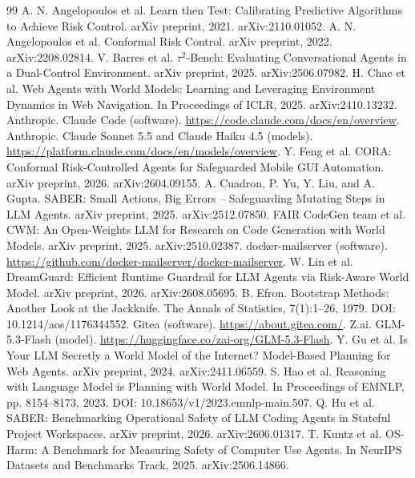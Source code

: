 \documentclass[11pt]{article}
\begin{document}
\begin{thebibliography}{99}\small
{} A. N. Angelopoulos et al. Learn then Test: Calibrating Predictive Algorithms to Achieve Risk Control. arXiv preprint, 2021. arXiv:2110.01052.
 A. N. Angelopoulos et al. Conformal Risk Control. arXiv preprint, 2022. arXiv:2208.02814.
 V. Barres et al. $\tau^2$-Bench: Evaluating Conversational Agents in a Dual-Control Environment. arXiv preprint, 2025. arXiv:2506.07982.
 H. Chae et al. Web Agents with World Models: Learning and Leveraging Environment Dynamics in Web Navigation. In Proceedings of ICLR, 2025. arXiv:2410.13232.
 Anthropic. Claude Code (software). \url{https://code.claude.com/docs/en/overview}.
 Anthropic. Claude Sonnet 5.5 and Claude Haiku 4.5 (models). \url{https://platform.claude.com/docs/en/models/overview}.
 Y. Feng et al. CORA: Conformal Risk-Controlled Agents for Safeguarded Mobile GUI Automation. arXiv preprint, 2026. arXiv:2604.09155.
 A. Cuadron, P. Yu, Y. Liu, and A. Gupta. SABER: Small Actions, Big Errors -- Safeguarding Mutating Steps in LLM Agents. arXiv preprint, 2025. arXiv:2512.07850.
 FAIR CodeGen team et al. CWM: An Open-Weights LLM for Research on Code Generation with World Models. arXiv preprint, 2025. arXiv:2510.02387.
 docker-mailserver (software). \url{https://github.com/docker-mailserver/docker-mailserver}.
 W. Lin et al. DreamGuard: Efficient Runtime Guardrail for LLM Agents via Risk-Aware World Model. arXiv preprint, 2026. arXiv:2608.05695.
 B. Efron. Bootstrap Methods: Another Look at the Jackknife. The Annals of Statistics, 7(1):1--26, 1979. DOI: 10.1214/aos/1176344552.
 Gitea (software). \url{https://about.gitea.com/}.
 Z.ai. GLM-5.3-Flash (model). \url{https://huggingface.co/zai-org/GLM-5.3-Flash}.
 Y. Gu et al. Is Your LLM Secretly a World Model of the Internet? Model-Based Planning for Web Agents. arXiv preprint, 2024. arXiv:2411.06559.
 S. Hao et al. Reasoning with Language Model is Planning with World Model. In Proceedings of EMNLP, pp. 8154--8173, 2023. DOI: 10.18653/v1/2023.emnlp-main.507.
 Q. Hu et al. SABER: Benchmarking Operational Safety of LLM Coding Agents in Stateful Project Workspaces. arXiv preprint, 2026. arXiv:2606.01317.
 T. Kuntz et al. OS-Harm: A Benchmark for Measuring Safety of Computer Use Agents. In NeurIPS Datasets and Benchmarks Track, 2025. arXiv:2506.14866.

\end{thebibliography}
\end{document}
